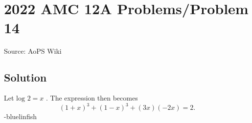 \documentclass[12pt]{article}
\begin{document}
\section*{{2022 AMC 12A Problems/Problem 14}}
Source: AoPS Wiki

\subsection*{Solution}
Let $\text{log } 2 = x$ . The expression then becomes \[(1+x)^3+(1-x)^3+(3x)(-2x)=\boxed{2}.\] -bluelinfish
\end{document}
